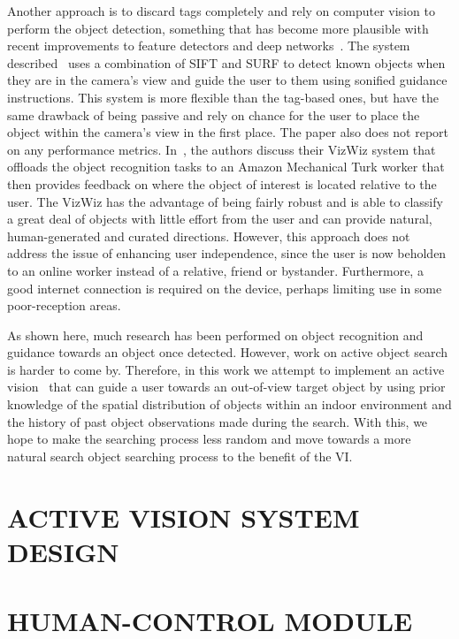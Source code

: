 \documentclass[a4paper, twoside]{article}
\begin{document}
Another approach is to discard tags completely and rely on computer vision to perform the object detection, something that has become more plausible with recent improvements to feature detectors and deep networks~\cite{huang2017speed,redmon2016you}. The system described~\cite{schauerte2012assistive} uses a combination of SIFT and SURF to detect known objects when they are in the camera's view and guide the user to them using sonified guidance instructions. This system is more flexible than the tag-based ones, but have the same drawback of being passive and rely on chance for the user to place the object within the camera's view in the first place. The paper also does not report on any performance metrics. In~\cite{bigham2010vizwiz}, the authors discuss their VizWiz system that offloads the object recognition tasks to an Amazon Mechanical Turk worker that then provides feedback on where the object of interest is located relative to the user. The VizWiz has the advantage of being fairly robust and is able to classify a great deal of objects with little effort from the user and can provide natural, human-generated and curated directions. However, this approach does not address the issue of enhancing user independence, since the user is now beholden to an online worker instead of a relative, friend or bystander. Furthermore, a good internet connection is required on the device, perhaps limiting use in some poor-reception areas.

As shown here, much research has been performed on object recognition and guidance towards an object once detected. However, work on active object search is harder to come by. Therefore, in this work we attempt to implement an active vision~\cite{aloimonos1988active, bellotto2013, lock2017portable} that can guide a user towards an out-of-view target object by using prior knowledge of the spatial distribution of objects within an indoor environment and the history of past object observations made during the search. With this, we hope to make the searching process less random and move towards a more natural search object searching process to the benefit of the VI.  

\section{\uppercase{Active Vision System Design}}\label{sec:system-design}

\section{\uppercase{Human-control Module}}\label{sec:controller-design}
\end{document}
